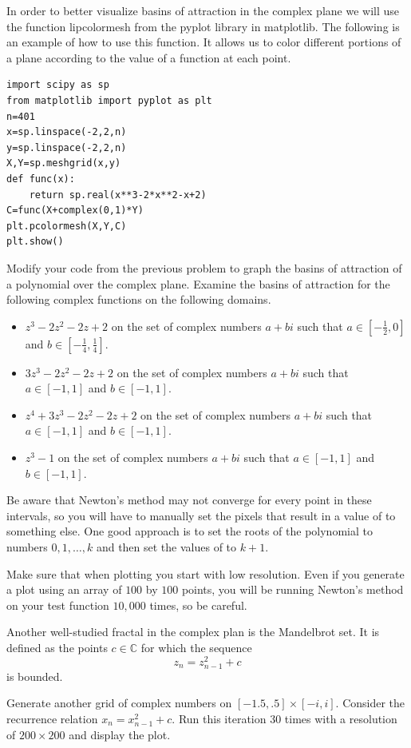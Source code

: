 In order to better visualize basins of attraction in the complex plane we will use the function li{pcolormesh} from the pyplot library in matplotlib.
The following is an example of how to use this function.
It allows us to color different portions of a plane according to the value of a function at each point.

\begin{lstlisting}
import scipy as sp
from matplotlib import pyplot as plt
n=401
x=sp.linspace(-2,2,n)
y=sp.linspace(-2,2,n)
X,Y=sp.meshgrid(x,y)
def func(x):
    return sp.real(x**3-2*x**2-x+2)
C=func(X+complex(0,1)*Y)
plt.pcolormesh(X,Y,C)
plt.show()
\end{lstlisting}

\begin{problem}
Modify your code from the previous problem to graph the basins of attraction of a polynomial over the complex plane.
Examine the basins of attraction for the following complex functions on the following domains.
\begin{itemize}

\item $z^3 - 2 z^2 - 2 z + 2$ on the set of complex numbers $a + b i$ such that $a \in \left[-\frac{1}{2}, 0\right]$ and $b \in \left[-\frac{1}{4}, \frac{1}{4}\right]$.

\item $3 z^3 - 2 z^2 - 2 z + 2$ on the set of complex numbers $a + b i$ such that $a \in \left[-1, 1\right]$ and $b \in \left[-1, 1\right]$.

\item $z^4 + 3 z^3 - 2 z^2 - 2 z + 2$ on the set of complex numbers $a + b i$ such that $a \in \left[-1, 1\right]$ and $b \in \left[-1, 1\right]$.

\item $z^3 - 1$ on the set of complex numbers $a + b i$ such that $a \in \left[-1, 1\right]$ and $b \in \left[-1, 1\right]$.

\end{itemize}
Be aware that Newton's method may not converge for every point in these intervals, so you will have to manually set the pixels that result in a value of  to something else.
One good approach is to set the roots of the polynomial to numbers $0, 1, \dots, k$ and then set the values of  to $k+1$.

Make sure that when plotting you start with low resolution.
Even if you generate a plot using an array of $100$ by $100$ points, you will be running Newton's method on your test function $10,000$ times, so be careful.
\end{problem}

Another well-studied fractal in the complex plan is the Mandelbrot set.
It is defined as the points $c \in \mathbb{C}$ for which the sequence
\[z_n = z_{n-1}^2 + c\]
is bounded.

\begin{problem}
Generate another grid of complex numbers on $[-1.5,.5]\times[-i,i]$.
Consider the recurrence relation $x_n = x_{n-1}^2 + c$.
Run this iteration 30 times with a resolution of $200 \times 200$ and display the plot.
\end{problem}
